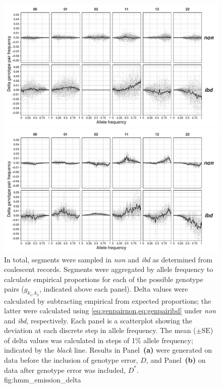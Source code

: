 

\begin{figure}[p]
{\scriptsize {}} \\
\includegraphics[width=\textwidth]{./img/ch4/hmm_emission_delta_tru}
{\scriptsize {}} \\
\includegraphics[width=\textwidth]{./img/ch4/hmm_emission_delta_err}
{In total,  segments were sampled in \emph{non} and \emph{ibd} as determined from coalescent records.
Segments were aggregated by allele frequency to calculate empirical proportions for each of the  possible genotype pairs (${g_{k_1,k_2}}$, indicated above each panel).
Delta values were calculated by subtracting empirical from expected proportions; the latter were calculated using \cref{eq:genpairnon,eq:genpairibd} under \emph{non} and \emph{ibd}, respectively.
Each panel is a scatterplot showing the deviation at each discrete step in allele frequency.
The mean (${\pm\text{SE}}$) of delta values was calculated in steps of 1\% allele frequency; indicated by the \emph{black} line.
Results in Panel~\textbf{(a)} were generated on data before the inclusion of genotype error, $D$, and Panel~\textbf{(b)} on data after genotype error was included, $D^{\ast}$.}
{fig:hmm_emission_delta}
\end{figure}
